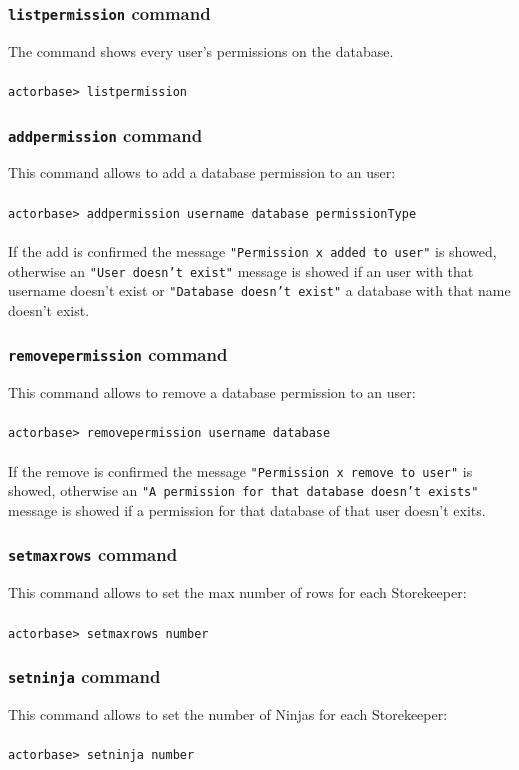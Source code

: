 \documentclass[a4paper]{article}
\begin{document}
	\subsubsection{\texttt{listpermission} command}
	The command shows every user's permissions on the database.
	\\ \\
	\texttt{actorbase> listpermission}

	\subsubsection{\texttt{addpermission} command}
	This command allows to add a database permission to an user:
	\\ \\
	\texttt{actorbase>	addpermission username database permissionType}
	\\ \\
	If the add is confirmed the message \texttt{"Permission x added to user"} is showed, otherwise an \texttt{"User doesn't exist"} message is showed if an user with that username doesn't exist or \texttt{"Database doesn't exist"} a database with that name doesn't exist.

	\subsubsection{\texttt{removepermission} command}
	This command allows to remove a database permission to an user:
	\\ \\
	\texttt{actorbase>	removepermission username database}
	\\ \\
	If the remove is confirmed the message \texttt{"Permission x remove to user"} is showed, otherwise an \texttt{"A permission for that database doesn't exists"} message is showed if a permission for that database of that user doesn't exits.
	
	\subsubsection{\texttt{setmaxrows} command}
	This command allows to set the max number of rows for each Storekeeper:
	\\ \\
	\texttt{actorbase>	setmaxrows number}

	\subsubsection{\texttt{setninja} command}
	This command allows to set the number of Ninjas for each Storekeeper:
	\\ \\
	\texttt{actorbase>	setninja number}
	
\end{document}
